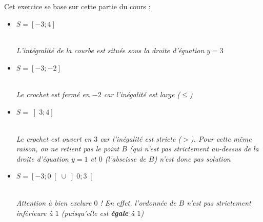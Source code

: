 \begin{corrige}
     Cet exercice se base sur cette partie du cours : 
     \begin{itemize}
          \item
          $S=\left[-3 ; 4\right]$
          \begin{center}
          \end{center} 
\\
          \textit{L'intégralité de la courbe est située sous la droite d'équation $y=3$}
\par
          \item
          $S=\left[-3 ; -2\right]$
          \begin{center}
          \end{center} 
\\
          \textit{Le crochet est fermé en $-2$ car l'inégalité est large ($\leqslant $)}
\par
          \item
          $S=\left] 3 ; 4\right]$
          \begin{center}
          \end{center} 
\\
          \textit{Le crochet est ouvert en $3$ car l'inégalité est stricte ($ > $). Pour cette même raison, on ne retient pas le point $B$ (qui n'est pas strictement au-dessus de la droite d'équation $y=1$ et $0$ (l'abscisse de $B$) n'est donc pas solution} 
          \item
          $S=\left[-3 ; 0\right[ \cup \left]0 ; 3\right[$
          \begin{center}
          \end{center} 
\\
          \textit{Attention à bien exclure $0$ ! En effet, l'ordonnée de $B$ n'est pas strictement inférieure à $1$ (puisqu'elle est \textbf{égale} à $1$)}
     \end{itemize}
\end{corrige}
